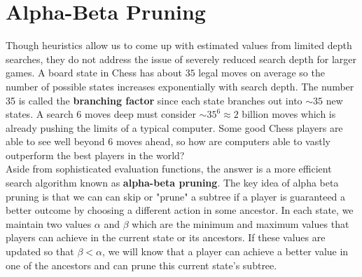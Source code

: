 \documentclass[12pt, letterpaper]{article}
\begin{document}
\section*{Alpha-Beta Pruning}
Though heuristics allow us to come up with estimated values from limited depth searches, they do not address the issue of severely reduced search depth for larger games. A board state in Chess has about $35$ legal moves on average so the number of possible states increases exponentially with search depth. The number 35 is called the \textbf{branching factor} since each state branches out into $\sim 35$ new states. A search $6$ moves deep must consider $\sim 35^6 \approx 2$ billion moves which is already pushing the limits of a typical computer. Some good Chess players are able to see well beyond $6$ moves ahead, so how are computers able to vastly outperform the best players in the world? \\[0.2cm]
Aside from sophisticated evaluation functions, the answer is a more efficient search algorithm known as \textbf{alpha-beta pruning}. The key idea of alpha beta pruning is that we can can skip or "prune" a subtree if a player is guaranteed a better outcome by choosing a different action in some ancestor. In each state, we maintain two values $\alpha$ and $\beta$ which are the minimum and maximum values that players can achieve in the current state or its ancestors. If these values are updated so that $\beta < \alpha$, we will know that a player can achieve a better value in one of the ancestors and can prune this current state's subtree.
\end{document}
